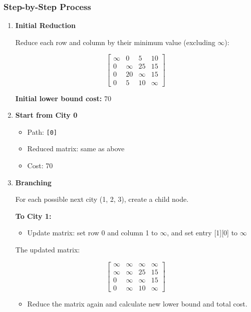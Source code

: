 \documentclass{article}
\begin{document}
\subsubsection*{Step-by-Step Process}
\begin{enumerate}
    \item \textbf{Initial Reduction}

    Reduce each row and column by their minimum value (excluding $\infty$):

    \[
    \begin{bmatrix}
    \infty & 0 & 5 & 10 \\
    0 & \infty & 25 & 15 \\
    0 & 20 & \infty & 15 \\
    0 & 5 & 10 & \infty
    \end{bmatrix}
    \]

    \textbf{Initial lower bound cost:} 70

    \item \textbf{Start from City 0}

    \begin{itemize}
        \item Path: \texttt{[0]}
        \item Reduced matrix: same as above
        \item Cost: 70
    \end{itemize}

    \item \textbf{Branching}

    For each possible next city (1, 2, 3), create a child node.

    \textbf{To City 1:}

    \begin{itemize}
        \item Update matrix: set row 0 and column 1 to $\infty$, and set entry [1][0] to $\infty$
    \end{itemize}

    The updated matrix:

    \[
    \begin{bmatrix}
    \infty & \infty & \infty & \infty \\
    \infty & \infty & 25 & 15 \\
    0 & \infty & \infty & 15 \\
    0 & \infty & 10 & \infty
    \end{bmatrix}
    \]

    \begin{itemize}
        \item Reduce the matrix again and calculate new lower bound and total cost.
    \end{itemize}


\end{enumerate}
\end{document}
